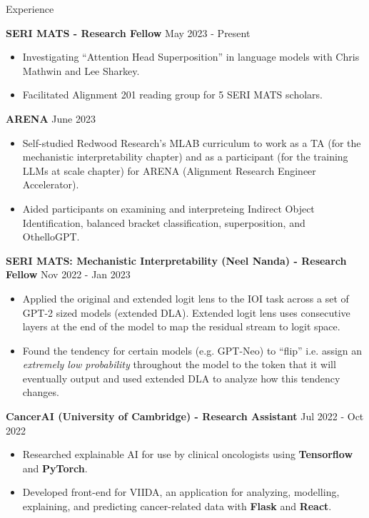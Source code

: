 \documentclass[hidelinks]{resume} %
\begin{document}
\begin{rSection}{Experience}

\textbf{SERI MATS - Research Fellow}
\hfill {May 2023 - Present}
\begin{itemize}
    \item Investigating ``Attention Head Superposition'' in language models with Chris Mathwin and Lee Sharkey.
    \item Facilitated Alignment 201 reading group for 5 SERI MATS scholars.
\end{itemize}

\textbf{ARENA}
\hfill{June 2023}
\begin{itemize}
    \item Self-studied Redwood Research's MLAB curriculum to work as a TA (for the mechanistic interpretability chapter) and as a participant (for the training LLMs at scale chapter) for ARENA (Alignment Research Engineer Accelerator).
    \item Aided participants on examining and interpreteing Indirect Object Identification, balanced bracket classification, superposition, and OthelloGPT.
\end{itemize}

\textbf{SERI MATS: Mechanistic Interpretability (Neel Nanda) - Research Fellow}
\hfill {Nov 2022 - Jan 2023}
\begin{itemize}
    \item Applied the original and extended logit lens to the IOI task across a set of GPT-2 sized models (extended DLA). Extended logit lens uses consecutive layers at the end of the model to map the residual stream to logit space.
    \item Found the tendency for certain models (e.g. GPT-Neo) to ``flip'' i.e. assign an \textit{extremely low probability} throughout the model to the token that it will eventually output and used extended DLA to analyze how this tendency changes.
\end{itemize}

\textbf{CancerAI (University of Cambridge) - Research Assistant}
\hfill {Jul 2022 - Oct 2022}
\begin{itemize}
    \item Researched explainable AI for use by clinical oncologists using \textbf{Tensorflow} and \textbf{PyTorch}.
    \item Developed front-end for VIIDA, an application for analyzing, modelling, explaining, and predicting cancer-related data with \textbf{Flask} and \textbf{React}.
\end{itemize}


\end{rSection}
\end{document}
